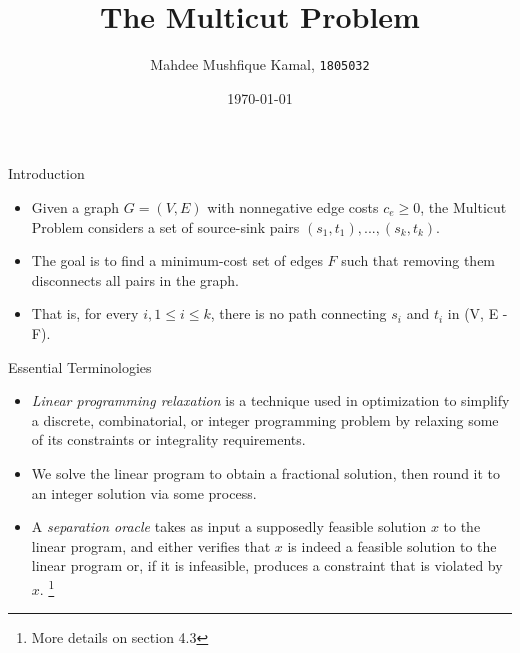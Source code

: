 \documentclass{beamer}
\title[The Multicut Problem]{The Multicut Problem}
\author[1805032]{
    Mahdee Mushfique Kamal, 
    \texttt{1805032} 
}
\institute[CSE,BUET]{
    Department of Computer Science and Engineering, \\
    Bangladesh University of Engineering and Technology,
    Dhaka, 1000. 
}
\date{\today}
\begin{document}
\begin{frame}
    \maketitle
\end{frame}


\begin{frame}{Introduction}
\begin{itemize}
    \item Given a graph \(G = (V, E)\) with nonnegative edge costs \(c_e \geq 0\), the Multicut Problem considers a set of source-sink pairs \((s_1, t_1), ..., (s_k, t_k)\). \newline

    \item The goal is to find a minimum-cost set of edges \(F\) such that removing them disconnects all pairs in the graph. \newline

    \item That is, for every $ i, 1 \leq i \leq k $, there is no path connecting \(s_i\) and \(t_i\) in (V, E - F).
\end{itemize}
\end{frame}



\begin{frame}{Essential Terminologies}
\begin{itemize}
    \item \textit{Linear programming relaxation} is a technique used in optimization to simplify a discrete, combinatorial, or integer programming problem by relaxing some of its constraints or integrality requirements. \newline

    \item We solve the linear program to obtain a fractional solution, then round it to an integer solution via some process. \newline

    \pause

    \item A \textit{separation oracle} takes as input a supposedly feasible solution $x$ to the linear program, and either verifies that $x$ is indeed a feasible solution to the linear program or, if it is infeasible, produces a constraint that is violated by $x$. \footnote{More details on section 4.3} 

\end{itemize}  
\end{frame}
\end{document}
